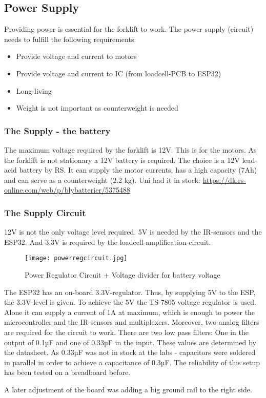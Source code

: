 \documentclass[../report.tex]{subfiles}
\begin{document}
\subsection{Power Supply}
Providing power is essential for the forklift to work. The power supply (circuit)
needs to fulfill the following requirements:
\begin{itemize}
    \item Provide voltage and current to motors
    \item Provide voltage and current to IC (from loadcell-PCB to ESP32)
    \item Long-living
    \item Weight is not important as counterweight is needed
\end{itemize} 
\subsubsection{The Supply - the battery}
The maximum voltage required by the forklift is 12V. This is for the motors. As the forklift
is not stationary a 12V battery is required. The choice is a 12V lead-acid 
battery by RS. It can supply the motor currents, has a high capacity (7Ah) and can serve as a counterweight (2.2 kg).
Uni had it in stock: \url{https://dk.rs-online.com/web/p/blybatterier/5375488}
\subsubsection{The Supply Circuit}
12V is not the only voltage level required. 5V is needed by the IR-sensors and the ESP32. And 3.3V is required
by the loadcell-amplification-circuit. 
\begin{figure}[h!]
    \centering
    \texttt{[image: powerregcircuit.jpg]}
    \caption{Power Regulator Circuit + Voltage divider for battery voltage}
 \end{figure}
The ESP32 has an on-board 3.3V-regulator. Thus, by supplying 5V to the ESP, the 3.3V-level is given.
To achieve the 5V the TS-7805 voltage regulator is used. Alone it can supply a current of 1A at maximum, which
is enough to power the microcontroller and the IR-sensors and multiplexers. Moreover, two analog filters are required
for the circuit to work. There are two low pass filters: One in the output of 0.1µF and one of 0.33µF in the input.
These values are determined by the datasheet. As 0.33µF was not in stock at the labs - capacitors were 
soldered in parallel in order to achieve a capacitance of 0.3µF. The reliability of this setup
has been tested on a breadboard before.

A later adjustment of the board was adding a big ground rail to the right side.
\end{document}
